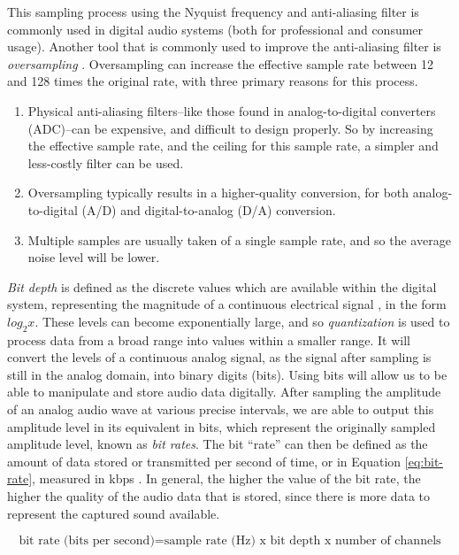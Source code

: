 This sampling process using the Nyquist frequency and anti-aliasing filter is commonly used in digital audio systems (both for professional and consumer usage). Another tool that is commonly used to improve the anti-aliasing filter is \textit{oversampling} \cite{Huber_Runstein_2018}. Oversampling can increase the effective sample rate between 12 and 128 times the original rate, with three primary reasons for this process.

\begin{enumerate}
	\item Physical anti-aliasing filters--like those found in analog-to-digital converters (ADC)--can be expensive, and difficult to design properly. So by increasing the effective sample rate, and the ceiling for this sample rate, a simpler and less-costly filter can be used.
	\item Oversampling typically results in a higher-quality conversion, for both analog-to-digital (A/D) and digital-to-analog (D/A) conversion.
	\item Multiple samples are usually taken of a single sample rate, and so the average noise level will be lower.
\end{enumerate}

\textit{Bit depth} is defined as the discrete values which are available within the digital system, representing the magnitude of a continuous electrical signal \cite{Zjalic_2021}, in the form $log_2{x}$. These levels can become exponentially large, and so \textit{quantization} is used to process data from a broad range into values within a smaller range. It will convert the levels of a continuous analog signal, as the signal after sampling is still in the analog domain, into binary digits (bits). Using bits will allow us to be able to manipulate and store audio data digitally. After sampling the amplitude of an analog audio wave at various precise intervals, we are able to output this amplitude level in its equivalent in bits, which represent the originally sampled amplitude level, known as \textit{bit rates}. The bit ``rate'' can then be defined as the amount of data stored or transmitted per second of time, or in Equation \ref{eq:bit-rate}, measured in kbps \cite{Zjalic_2021}. In general, the higher the value of the bit rate, the higher the quality of the audio data that is stored, since there is more data to represent the captured sound available.

\begin{equation}
	\textrm{bit rate (bits per second)} = \textrm{sample rate (Hz) x } \textrm{bit depth x } \textrm{number of channels}
	\label{eq:bit-rate}	
\end{equation}

